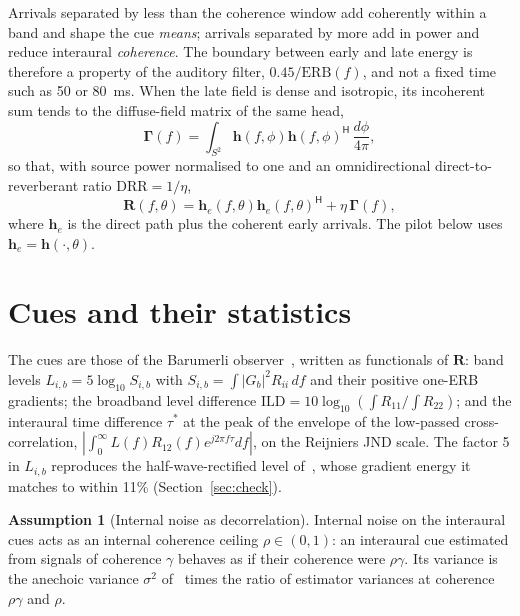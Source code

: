 \documentclass[10pt]{article}
\theoremstyle{definition}
\newtheorem{assumption}{Assumption}
\begin{document}
Arrivals separated by less than the coherence window add coherently within a band and shape the cue \emph{means}; arrivals separated by more add in power and reduce interaural \emph{coherence}. The boundary between early and late energy is therefore a property of the auditory filter, $0.45/\mathrm{ERB}(f)$, and not a fixed time such as 50 or 80~ms. When the late field is dense and isotropic, its incoherent sum tends to the diffuse-field matrix of the same head,
\begin{equation}
\bm\Gamma(f)=\int_{S^2}\bm h(f,\phi)\bm h(f,\phi)^{\mathsf H}\,\frac{d\phi}{4\pi},
\end{equation}
so that, with source power normalised to one and an omnidirectional direct-to-reverberant ratio $\mathrm{DRR}=1/\eta$,
\begin{equation}
\bm R(f,\theta)=\bm h_e(f,\theta)\bm h_e(f,\theta)^{\mathsf H}+\eta\,\bm\Gamma(f),
\label{eq:R}
\end{equation}
where $\bm h_e$ is the direct path plus the coherent early arrivals. The pilot below uses $\bm h_e=\bm h(\cdot,\theta)$.

\section{Cues and their statistics}

The cues are those of the Barumerli observer~\cite{barumerli2023}, written as functionals of $\bm R$: band levels $L_{i,b}=5\log_{10}S_{i,b}$ with $S_{i,b}=\int|G_b|^2R_{ii}\,df$ and their positive one-ERB gradients; the broadband level difference $\mathrm{ILD}=10\log_{10}(\int R_{11}/\int R_{22})$; and the interaural time difference $\tau^{*}$ at the peak of the envelope of the low-passed cross-correlation, $|\int_0^\infty L(f)R_{12}(f)e^{j2\pi f\tau}df|$, on the Reijniers JND scale. The factor 5 in $L_{i,b}$ reproduces the half-wave-rectified level of~\cite{barumerli2023}, whose gradient energy it matches to within 11\% (Section~\ref{sec:check}).

\begin{assumption}[Internal noise as decorrelation]\label{ass:noise}
Internal noise on the interaural cues acts as an internal coherence ceiling $\rho\in(0,1)$: an interaural cue estimated from signals of coherence $\gamma$ behaves as if their coherence were $\rho\gamma$. Its variance is the anechoic variance $\sigma^2$ of~\cite{bassett2026} times the ratio of estimator variances at coherence $\rho\gamma$ and $\rho$.
\end{assumption}
\end{document}
